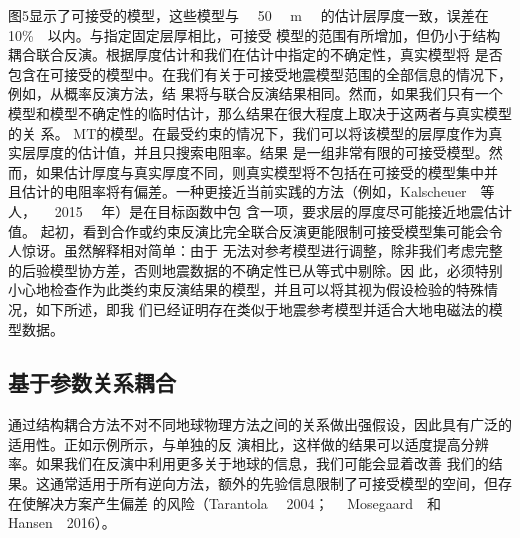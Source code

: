 图5显示了可接受的模型，这些模型与   50   m   的估计层厚度一致，误差在   10\%  以内。与指定固定层厚相比，可接受 模型的范围有所增加，但仍小于结构耦合联合反演。根据厚度估计和我们在估计中指定的不确定性，真实模型将 是否包含在可接受的模型中。在我们有关于可接受地震模型范围的全部信息的情况下，例如，从概率反演方法，结 果将与联合反演结果相同。然而，如果我们只有一个模型和模型不确定性的临时估计，那么结果在很大程度上取决于这两者与真实模型的关 系。 MT的模型。在最受约束的情况下，我们可以将该模型的层厚度作为真实层厚度的估计值，并且只搜索电阻率。结果 是一组非常有限的可接受模型。然而，如果估计厚度与真实厚度不同，则真实模型将不包括在可接受的模型集中并 且估计的电阻率将有偏差。一种更接近当前实践的方法（例如，Kalscheuer  等人，   2015   年）是在目标函数中包 含一项，要求层的厚度尽可能接近地震估计值。 起初，看到合作或约束反演比完全联合反演更能限制可接受模型集可能会令人惊讶。虽然解释相对简单：由于 无法对参考模型进行调整，除非我们考虑完整的后验模型协方差，否则地震数据的不确定性已从等式中剔除。因 此，必须特别小心地检查作为此类约束反演结果的模型，并且可以将其视为假设检验的特殊情况，如下所述，即我 们已经证明存在类似于地震参考模型并适合大地电磁法的模型数据。

\subsection{基于参数关系耦合}

通过结构耦合方法不对不同地球物理方法之间的关系做出强假设，因此具有广泛的适用性。正如示例所示，与单独的反 演相比，这样做的结果可以适度提高分辨率。如果我们在反演中利用更多关于地球的信息，我们可能会显着改善 我们的结果。这通常适用于所有逆向方法，额外的先验信息限制了可接受模型的空间，但存在使解决方案产生偏差 的风险（Tarantola   2004；   Mosegaard  和   Hansen  2016）。
